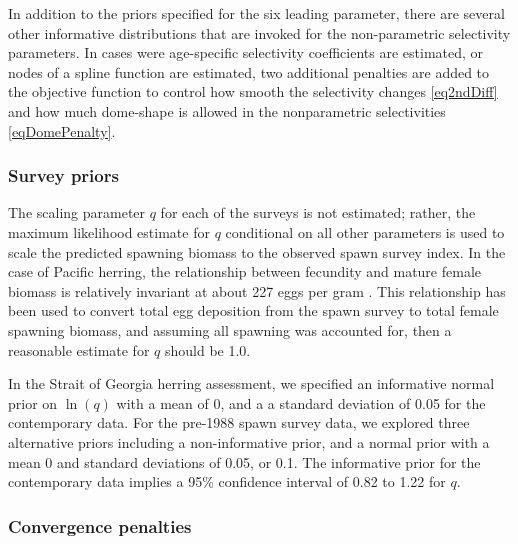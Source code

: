 In addition to the priors specified for the six leading parameter, there are several other informative distributions that are invoked for the non-parametric selectivity parameters.  In cases were age-specific selectivity coefficients are estimated, or nodes of a spline function are estimated, two additional penalties are added to the objective function to control how smooth the selectivity changes \eqref{eq2ndDiff} and how much dome-shape is allowed in the nonparametric selectivities \eqref{eqDomePenalty}.  

\subsubsection{Survey priors}

The scaling parameter $q$ for each of the surveys is not estimated; rather, the maximum likelihood estimate for $q$ conditional on all other parameters is used to scale the predicted spawning biomass to the observed spawn survey index.  In the case of Pacific herring, the relationship between fecundity and mature female biomass is relatively invariant at about 227 eggs per gram \citep{hardwick1973biomass}.  This relationship has been used to convert total egg deposition from the spawn survey to total female spawning biomass, and assuming all spawning was accounted for, then a reasonable estimate for $q$ should be 1.0.

In the Strait of Georgia herring assessment, we specified an informative normal prior on $\ln(q)$ with a mean of 0, and a a standard deviation of 0.05 for the contemporary data.  For the pre-1988 spawn survey data, we explored three alternative priors including a non-informative prior, and a normal prior with a mean 0 and standard deviations of 0.05, or 0.1.  The informative prior for the contemporary data implies a 95\% confidence interval of 0.82 to 1.22 for $q$.

\subsubsection{Convergence penalties}

